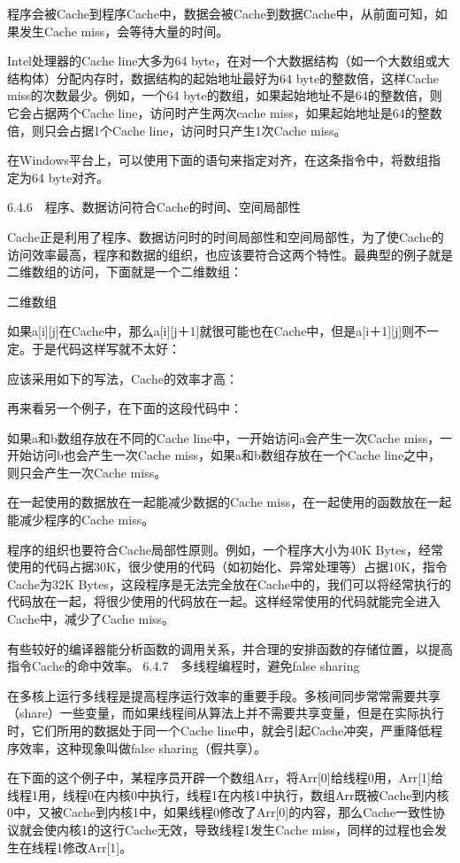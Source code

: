 \documentclass[12pt,UTF8]{ctexbook}
\begin{document}
程序会被Cache到程序Cache中，数据会被Cache到数据Cache中，从前面可知，如果发生Cache miss，会等待大量的时间。

Intel处理器的Cache line大多为64 byte，在对一个大数据结构（如一个大数组或大结构体）分配内存时，数据结构的起始地址最好为64 byte的整数倍，这样Cache miss的次数最少。例如，一个64 byte的数组，如果起始地址不是64的整数倍，则它会占据两个Cache line，访问时产生两次cache miss，如果起始地址是64的整数倍，则只会占据1个Cache line，访问时只产生1次Cache miss。

在Windows平台上，可以使用下面的语句来指定对齐，在这条指令中，将数组指定为64 byte对齐。

6.4.6　程序、数据访问符合Cache的时间、空间局部性

Cache正是利用了程序、数据访问时的时间局部性和空间局部性，为了使Cache的访问效率最高，程序和数据的组织，也应该要符合这两个特性。最典型的例子就是二维数组的访问，下面就是一个二维数组：

二维数组

如果a[i][j]在Cache中，那么a[i][j＋1]就很可能也在Cache中，但是a[i＋1][j]则不一定。于是代码这样写就不太好：

应该采用如下的写法，Cache的效率才高：

再来看另一个例子，在下面的这段代码中：

如果a和b数组存放在不同的Cache line中，一开始访问a会产生一次Cache miss，一开始访问b也会产生一次Cache miss，如果a和b数组存放在一个Cache line之中，则只会产生一次Cache miss。

在一起使用的数据放在一起能减少数据的Cache miss，在一起使用的函数放在一起能减少程序的Cache miss。

程序的组织也要符合Cache局部性原则。例如，一个程序大小为40K Bytes，经常使用的代码占据30K，很少使用的代码（如初始化、异常处理等）占据10K，指令Cache为32K Bytes，这段程序是无法完全放在Cache中的，我们可以将经常执行的代码放在一起，将很少使用的代码放在一起。这样经常使用的代码就能完全进入Cache中，减少了Cache miss。

有些较好的编译器能分析函数的调用关系，并合理的安排函数的存储位置，以提高指令Cache的命中效率。
6.4.7　多线程编程时，避免false sharing

在多核上运行多线程是提高程序运行效率的重要手段。多核间同步常常需要共享（share）一些变量，而如果线程间从算法上并不需要共享变量，但是在实际执行时，它们所用的数据处于同一个Cache line中，就会引起Cache冲突，严重降低程序效率，这种现象叫做false sharing（假共享）。

在下面的这个例子中，某程序员开辟一个数组Arr，将Arr[0]给线程0用，Arr[1]给线程1用，线程0在内核0中执行，线程1在内核1中执行，数组Arr既被Cache到内核0中，又被Cache到内核1中，如果线程0修改了Arr[0]的内容，那么Cache一致性协议就会使内核1的这行Cache无效，导致线程1发生Cache miss，同样的过程也会发生在线程1修改Arr[1]。
\end{document}
